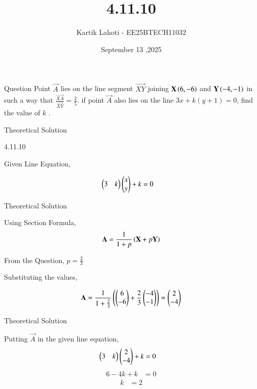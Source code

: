\documentclass{beamer}
\title %
{4.11.10}
\date{September 13 ,2025}
\author 
{Kartik Lahoti - EE25BTECH11032}
\begin{document}
\frame{\titlepage}
\begin{frame}{Question}
Point $\vec{A}$ lies on the line segment $\vec{XY}$  joining $\mathbf{X}\left(6,-6\right)$ and $\mathbf{Y}\left(-4,-1\right)$ in such a way that $\frac{\vec{XA}}{\vec{XY}} = \frac{2}{5}$. if point $\vec{A}$ also lies on the line $3x + k(y+1) = 0$, find the value of $k$ .
\end{frame}

\begin{frame}{Theoretical Solution}

\begin{table}[H]
    \centering
    
    \caption{4.11.10}
    \label{tab:placeholder_1}
\end{table}

Given Line Equation, 

\begin{align}
        \begin{pmatrix}3 & k\end{pmatrix}\begin{pmatrix}x \\ y\end{pmatrix} + k &= 0  
\end{align}

\end{frame}
\begin{frame}{Theoretical Solution}

Using Section Formula,
\begin{align}
  \mathbf{A} = \frac{1}{1+p}\left(\mathbf{X} + p\mathbf{Y}\right)
\end{align}

From the Question, $p = \frac{2}{3}$

Substituting the values, 

\begin{align}
  \mathbf{A} =  \frac{1}{1 + \frac{2}{3}}\left(\begin{pmatrix}6 \\ -6\end{pmatrix} + \frac{2}{3}\begin{pmatrix}-4\\-1\end{pmatrix}\right) = \begin{pmatrix}2 \\ -4\end{pmatrix}
\end{align}

\end{frame}
\begin{frame}{Theoretical Solution}

Putting $\vec{A}$ in the given line equation,
\begin{align}
  \begin{pmatrix}3 & k\end{pmatrix}\begin{pmatrix}2 \\ -4 \end{pmatrix} + k &= 0 
\end{align}
\begin{align}
    6 - 4k + k &= 0 
\end{align}
\begin{align}
    k &= 2
\end{align}
\end{frame}
\end{document}
